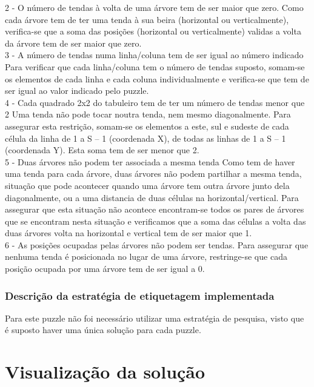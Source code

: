 \documentclass[runningheads,a4paper]{llncs}
\begin{document}
2 - O número de tendas à volta de uma árvore tem de ser maior que zero.
Como cada árvore tem de ter uma tenda à sua beira (horizontal ou verticalmente), verifica-se que a soma das posições (horizontal ou verticalmente) validas a volta da árvore tem de ser maior que zero.\\

3 - A número de tendas numa linha/coluna tem de ser igual ao número indicado
Para verificar que cada linha/coluna tem o número de tendas suposto, somam-se os elementos de cada linha e cada coluna individualmente e verifica-se que tem de ser igual ao valor indicado pelo puzzle.\\

4 - Cada quadrado 2x2 do tabuleiro tem de ter um número de tendas menor que 2
Uma tenda não pode tocar noutra tenda, nem mesmo diagonalmente. Para assegurar esta restrição, somam-se os elementos a este, sul e sudeste de cada célula da linha de 1 a S – 1 (coordenada X), de todas as linhas de 1 a S – 1 (coordenada Y). Esta soma tem de ser menor que 2.\\



5 - Duas árvores não podem ter associada a mesma tenda
Como tem de haver uma tenda para cada árvore, duas árvores não podem partilhar a mesma tenda, situação que pode acontecer quando uma árvore tem outra árvore junto dela diagonalmente, ou a uma distancia de duas células na horizontal/vertical. Para assegurar que esta situação não acontece encontram-se todos os pares de árvores que se encontram nesta situação e verificamos que a soma das células a volta das duas árvores volta na horizontal e vertical tem de ser maior que 1.\\

6 - As posições ocupadas pelas árvores não podem ser tendas.
Para assegurar que nenhuma tenda é posicionada no lugar de uma árvore, restringe-se que cada posição ocupada por uma árvore tem de ser igual a 0.\\


\subsubsection{Descrição da estratégia de etiquetagem implementada}

Para este puzzle não foi necessário utilizar uma estratégia de pesquisa, visto que é suposto haver uma única solução para cada puzzle.

\section{Visualização da solução}
\end{document}
